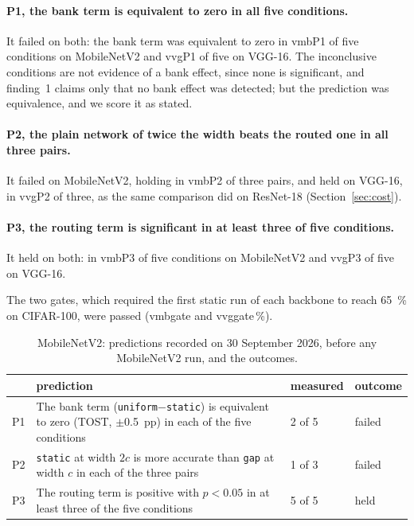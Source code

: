 \documentclass[10pt,a4paper]{article}
\newcommand{\V}[1]{\csname v#1\endcsname}
\begin{document}
\paragraph{P1, the bank term is equivalent to zero in all five
conditions.} It failed on both: the bank term was equivalent to zero in
\V{mbP1} of five conditions on MobileNetV2 and \V{vgP1} of five on VGG-16.
The inconclusive conditions are not evidence of a bank effect, since none
is significant, and finding~1 claims only that no bank effect was
detected; but the prediction was equivalence, and we score it as stated.

\paragraph{P2, the plain network of twice the width beats the routed one
in all three pairs.} It failed on MobileNetV2, holding in \V{mbP2} of three
pairs, and held on VGG-16, in \V{vgP2} of three, as the same comparison
did on ResNet-18 (Section~\ref{sec:cost}).

\paragraph{P3, the routing term is significant in at least three of five
conditions.} It held on both: in \V{mbP3} of five conditions on
MobileNetV2 and \V{vgP3} of five on VGG-16.

The two gates, which required the first static run of each backbone to
reach \SI{65}{\percent} on CIFAR-100, were passed (\V{mbgate} and
\V{vggate}\,\%).

\begin{table}[!htbp]\centering\small
\caption{MobileNetV2: predictions recorded on 30 September 2026, before
any MobileNetV2 run, and the outcomes.}
\label{tab:mbprereg}
\begin{tabular}{l p{8.2cm} l l}
\toprule
& prediction & measured & outcome \\
\midrule
P1 & The bank term (\texttt{uniform}$-$\texttt{static}) is equivalent to zero (TOST, $\pm$\SI{0.5}{pp}) in each of the five conditions & 2 of 5 & failed \\
P2 & \texttt{static} at width $2c$ is more accurate than \texttt{gap} at width $c$ in each of the three pairs & 1 of 3 & failed \\
P3 & The routing term is positive with $p<0.05$ in at least three of the five conditions & 5 of 5 & held \\
\bottomrule
\end{tabular}
\end{table}
\end{document}
